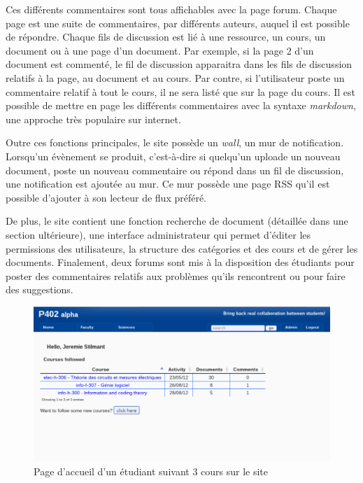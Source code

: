 \documentclass[a4paper,12pt]{article}
\begin{document}
Ces différents commentaires sont tous affichables avec la page forum. Chaque page
est une suite de commentaires, par différents auteurs, auquel il est possible
de répondre. Chaque fils de discussion est lié à une ressource, un cours, un
document ou à une page d'un document. Par exemple, si la page 2 d'un document
est commenté, le fil de discussion apparaitra dans les fils de discussion
relatifs à la page, au document et au cours. Par contre, si l'utilisateur
poste un commentaire relatif à tout le cours, il ne sera listé que sur la page
du cours. Il est possible de mettre en page les différents commentaires avec la syntaxe
\textit{markdown}, une approche très populaire sur internet.

Outre ces fonctions principales, le site possède un \textit{wall}, un mur
de notification. Lorsqu'un évènement se produit, c'est-à-dire
si quelqu'un uploade un nouveau document, poste un nouveau commentaire ou répond
dans un fil de discussion, une notification est ajoutée au mur. Ce mur possède
une page RSS qu'il est possible d'ajouter à son lecteur de flux préféré.

De plus, le site contient une fonction recherche de document (détaillée dans une
section ultérieure), une interface administrateur qui permet d'éditer les permissions
des utilisateurs, la structure des catégories et des cours et de gérer les documents.
Finalement, deux forums sont mis à la disposition des étudiants pour poster
des commentaires relatifs aux problèmes qu'ils rencontrent ou pour faire des suggestions.

\begin{figure}
  \centering\includegraphics[scale=0.5]{imgs/home.pdf}
  \caption{Page d'accueil d'un étudiant suivant 3 cours sur le site}
  \label{fig:home}
\end{figure}
\end{document}
